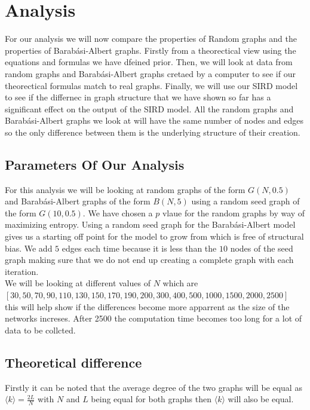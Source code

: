 \documentclass{article}
\begin{document}
        \section{Analysis}
            For our analysis we will now compare the properties of Random graphs and the properties of Barabási-Albert graphs. Firstly from a theorectical view using the equations and formulas we have dfeined prior. Then, we will look at data from random graphs and Barabási-Albert graphs cretaed by a computer to see if our theorectical formulas match to real graphs. Finally, we will use our SIRD model to see if the differnec in graph structure that we have shown so far has a significant effect on the output of the SIRD model. All the random graphs and Barabási-Albert graphs we look at will have the same number of nodes and edges so the only difference between them is the underlying structure of their creation.
            \subsection{Parameters Of Our Analysis}
            For this analysis we will be looking at random graphs of the form $G(N,0.5)$ and Barabási-Albert graphs of the form $B(N,5)$ using a random seed graph of the form $G(10,0.5)$. We have chosen a $p$ vlaue for the random graphs by way of maximizing entropy. Using a random seed graph for the Barabási-Albert model gives us a starting off point for the model to grow from which is free of structural bias. We add $5$ edges each time because it is less than the $10$ nodes of the seed graph making sure that we do not end up creating a complete graph with each iteration.\\ 
            We will be looking at different values of $N$ which are\\ $ [30,50,70,90,110,130,150,170,190,200,300,400,500,1000,1500,2000,2500]$\\ this will help show if the differences become more apparrent as the size of the networks increses. After 2500 the computation time becomes too long for a lot of data to be collcted.
            \subsection{Theoretical difference}
            Firstly it can be noted that the average degree of the two graphs will be equal as $\langle k \rangle = \frac{2L}{N}$ with $N$ and $L$ being equal for both graphs then $\langle k \rangle$ will also be equal.
\end{document}
